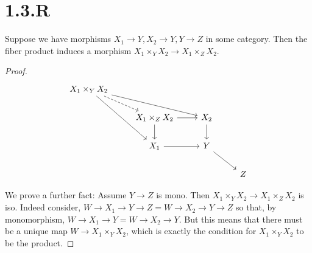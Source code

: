 \documentclass{article}
\begin{document}
\section{1.3.R}
\begin{theorem}
    Suppose we have morphisms $X_1 \to Y, X_2 \to Y, Y \to Z$ in some category. Then the
    fiber product induces a morphism $X_1 \times_Y X_2 \to X_1 \times_Z X_2$.
\end{theorem}
\begin{proof}
    \[
        \begin{tikzcd}
            {X_1\times_YX_2}                \\
             & {X_1\times_ZX_2} & {X_2}     \\
             & {X_1}            & Y         \\
             &                  &       & Z
            \arrow[from=3-2, to=3-3]
            \arrow[from=2-3, to=3-3]
            \arrow[from=3-3, to=4-4]
            \arrow[from=2-2, to=3-2]
            \arrow[from=2-2, to=2-3]
            \arrow[from=1-1, to=3-2]
            \arrow[from=1-1, to=2-3]
            \arrow[dashed, from=1-1, to=2-2]
        \end{tikzcd}
    \]

    We prove a further fact: Assume $Y \to Z$ is mono. Then
    $X_1\times_YX_2 \to X_1\times_ZX_2$ is iso. Indeed consider, $W \to X_1 \to Y \to Z = W \to X_2 \to Y \to Z$ so that,
    by monomorphism, $W \to X_1 \to Y = W \to X_2 \to Y$. But this means that there must be a
    unique map $W \to X_1 \times_Y X_2$, which is exactly the condition for
    $X_1 \times_Y X_2$ to be the product.
\end{proof}
\end{document}
